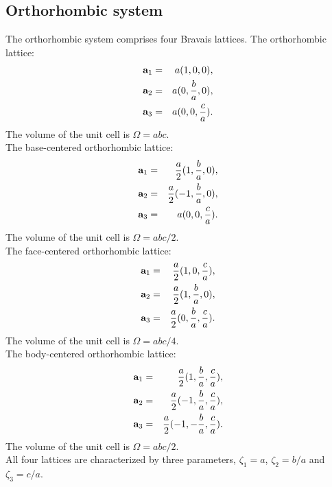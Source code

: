 \documentclass[12pt,a4paper]{article}
\begin{document}
\subsection{\color{web-blue}Orthorhombic system}
The orthorhombic system comprises four Bravais lattices.
The orthorhombic lattice:
\begin{eqnarray}
{\bf a}_1 &=& a (1, 0, 0), \nonumber \\
{\bf a}_2 &=& a (0, {b\over a}, 0), \nonumber \\
{\bf a}_3 &=& a (0, 0, {c\over a}). \nonumber
\nonumber
\end{eqnarray}
The volume of the unit cell is $\Omega = abc$. \\
The base-centered orthorhombic lattice:
\begin{eqnarray}
{\bf a}_1 &=& {a \over 2} (1, {b \over a}, 0), \nonumber \\
{\bf a}_2 &=& {a \over 2} (-1, {b \over a}, 0), \nonumber \\
{\bf a}_3 &=& a  (0, 0, {c \over a}). \nonumber
\nonumber
\end{eqnarray}
The volume of the unit cell is $\Omega = abc/2$. \\
The face-centered orthorhombic lattice:
\begin{eqnarray}
{\bf a}_1 &=& {a \over 2} (1, 0, {c \over a}), \nonumber \\
{\bf a}_2 &=& {a \over 2} (1, {b \over a}, 0), \nonumber \\
{\bf a}_3 &=& {a \over 2} (0, {b \over a}, {c \over a}). \nonumber
\nonumber
\end{eqnarray}
The volume of the unit cell is $\Omega = abc/4$. \\
The body-centered orthorhombic lattice:
\begin{eqnarray}
{\bf a}_1 &=& {a \over 2} (1, {b \over a}, {c \over a}), \nonumber \\
{\bf a}_2 &=& {a \over 2} (-1, {b \over a}, {c \over a}), \nonumber \\
{\bf a}_3 &=& {a \over 2} (-1, -{b \over a}, {c \over a}). \nonumber
\nonumber
\end{eqnarray}
The volume of the unit cell is $\Omega = abc/2$. \\
All four lattices are characterized by three parameters, 
$\zeta_1=a$, $\zeta_2=b/a$ and $\zeta_3=c/a$.
\end{document}
